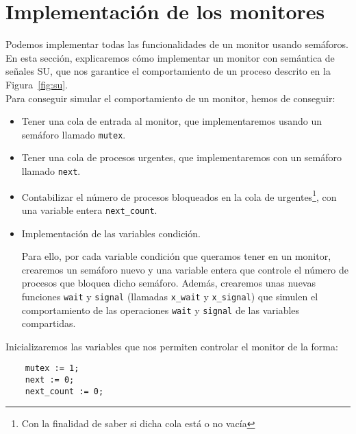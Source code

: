\section{Implementación de los monitores}
Podemos implementar todas las funcionalidades de un monitor usando semáforos. En esta sección, explicaremos cómo implementar un monitor con semántica de señales SU, que nos garantice el comportamiento de un proceso descrito en la Figura~\ref{fig:su}.\\

Para conseguir simular el comportamiento de un monitor, hemos de conseguir:
\begin{itemize}
    \item Tener una cola de entrada al monitor, que implementaremos usando un semáforo llamado \verb|mutex|.
    \item Tener una cola de procesos urgentes, que implementaremos con un semáforo llamado \verb|next|.
    \item Contabilizar el número de procesos bloqueados en la cola de urgentes\footnote{Con la finalidad de saber si dicha cola está o no vacía}, con una variable entera \verb|next_count|.
    \item Implementación de las variables condición.

        Para ello, por cada variable condición que queramos tener en un monitor, crearemos un semáforo nuevo y una variable entera que controle el número de procesos que bloquea dicho semáforo. Además, crearemos unas nuevas funciones \verb|wait| y \verb|signal| (llamadas \verb|x_wait| y \verb|x_signal|) que simulen el comportamiento de las operaciones \verb|wait| y \verb|signal| de las variables compartidas.
\end{itemize}

Inicializaremos las variables que nos permiten controlar el monitor de la forma:
\begin{verbatim}
    mutex := 1;
    next := 0;
    next_count := 0;
\end{verbatim}

